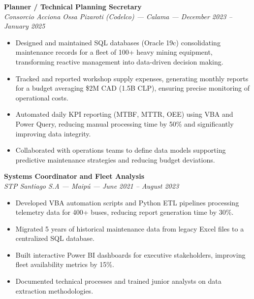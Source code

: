 \documentclass[10pt,letterpaper]{article}
\begin{document}
\vspace{0.2cm}

\noindent \textbf{Planner / Technical Planning Secretary} \\
\textit{Consorcio Acciona Ossa Pizaroti (Codelco) — Calama — December 2023 – January 2025}
\begin{itemize}
    \item Designed and maintained SQL databases (Oracle 19c) consolidating maintenance records for a fleet of 100+ heavy mining equipment, transforming reactive management into data-driven decision making.
    \item Tracked and reported workshop supply expenses, generating monthly reports for a budget averaging \$2M CAD (1.5B CLP), ensuring precise monitoring of operational costs.
    \item Automated daily KPI reporting (MTBF, MTTR, OEE) using VBA and Power Query, reducing manual processing time by 50\% and significantly improving data integrity.
    \item Collaborated with operations teams to define data models supporting predictive maintenance strategies and reducing budget deviations.
\end{itemize}

\vspace{0.2cm}

\noindent \textbf{Systems Coordinator and Fleet Analysis} \\
\textit{STP Santiago S.A — Maipú — June 2021 – August 2023}
\begin{itemize}
    \item Developed VBA automation scripts and Python ETL pipelines processing telemetry data for 400+ buses, reducing report generation time by 30\%.
    \item Migrated 5 years of historical maintenance data from legacy Excel files to a centralized SQL database.
    \item Built interactive Power BI dashboards for executive stakeholders, improving fleet availability metrics by 15\%.
    \item Documented technical processes and trained junior analysts on data extraction methodologies.
\end{itemize}

\vspace{0.4cm}


\vspace{0.3cm}
\end{document}
